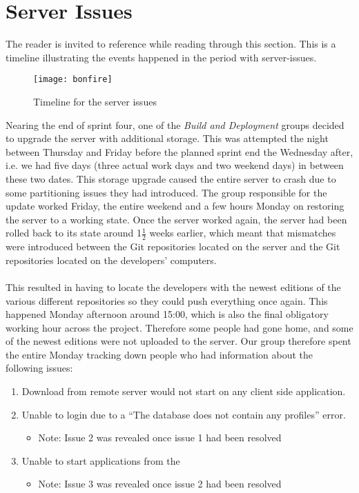 
\section{Server Issues}
\label{sec:server_issues}

The reader is invited to reference  while reading through this section. This is a timeline illustrating the events happened in the period with server-issues. 

\begin{figure}[!htbp]
	\centering
	\texttt{[image: bonfire]}
	\caption{Timeline for the server issues}
	\label{fig:bonefire}
\end{figure}

Nearing the end of sprint four, one of the \emph{Build and Deployment} groups decided to upgrade the server with additional storage. This was attempted the night between Thursday and Friday before the planned sprint end the Wednesday after, i.e. we had five days (three actual work days and two weekend days) in between these two dates. This storage upgrade caused the entire server to crash due to some partitioning issues they had introduced. The group responsible for the update worked Friday, the entire weekend and a few hours Monday on restoring the server to a working state. Once the server worked again, the server had been rolled back to its state around 1$\frac{1}{2}$ weeks earlier, which meant that mismatches were introduced between the Git repositories located on the server and the Git repositories located on the developers' computers. 
\\\\
This resulted in having to locate the developers with the newest editions of the various different repositories so they could push everything once again. This happened Monday afternoon around 15:00, which is also the final obligatory working hour across the project. Therefore some people had gone home, and some of the newest editions were not uploaded to the server. Our group therefore spent the entire Monday tracking down people who had information about the following issues:

\begin{enumerate}
    \item Download from remote server would not start on any client side application.
    \item Unable to login due to a ``The database does not contain any profiles'' error.
    \begin{itemize}
        \item Note: Issue 2 was revealed once issue 1 had been resolved
    \end{itemize}
    \item Unable to start applications from the \launcher  
    \begin{itemize}
        \item Note: Issue 3 was revealed once issue 2 had been resolved
    \end{itemize}
\end{enumerate}


